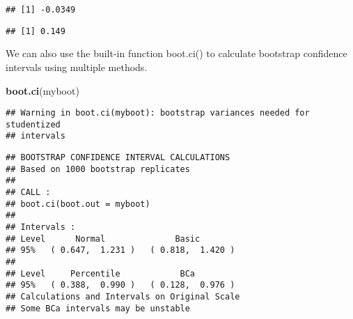 \documentclass[]{book}
\newenvironment{Shaded}{\begin{snugshade}}{\end{snugshade}}
\newcommand{\KeywordTok}[1]{\textcolor[rgb]{0.13,0.29,0.53}{\textbf{#1}}}
\newcommand{\FloatTok}[1]{\textcolor[rgb]{0.00,0.00,0.81}{#1}}
\newcommand{\CommentTok}[1]{\textcolor[rgb]{0.56,0.35,0.01}{\textit{#1}}}
\newcommand{\OperatorTok}[1]{\textcolor[rgb]{0.81,0.36,0.00}{\textbf{#1}}}
\newcommand{\NormalTok}[1]{#1}
\theoremstyle{definition}
\theoremstyle{definition}
\theoremstyle{definition}
\theoremstyle{remark}
\begin{document}
\begin{Shaded}
\end{Shaded}

\begin{verbatim}
## [1] -0.0349
\end{verbatim}

\begin{Shaded}
\end{Shaded}

\begin{verbatim}
## [1] 0.149
\end{verbatim}

We can also use the built-in function boot.ci() to calculate bootstrap
confidence intervals using multiple methods.

\begin{Shaded}
\begin{Highlighting}[]
\KeywordTok{boot.ci}\NormalTok{(myboot)}
\end{Highlighting}
\end{Shaded}

\begin{verbatim}
## Warning in boot.ci(myboot): bootstrap variances needed for studentized
## intervals
\end{verbatim}

\begin{verbatim}
## BOOTSTRAP CONFIDENCE INTERVAL CALCULATIONS
## Based on 1000 bootstrap replicates
## 
## CALL : 
## boot.ci(boot.out = myboot)
## 
## Intervals : 
## Level      Normal              Basic         
## 95%   ( 0.647,  1.231 )   ( 0.818,  1.420 )  
## 
## Level     Percentile            BCa          
## 95%   ( 0.388,  0.990 )   ( 0.128,  0.976 )  
## Calculations and Intervals on Original Scale
## Some BCa intervals may be unstable
\end{verbatim}

\begin{Shaded}
\end{Shaded}
\end{document}

